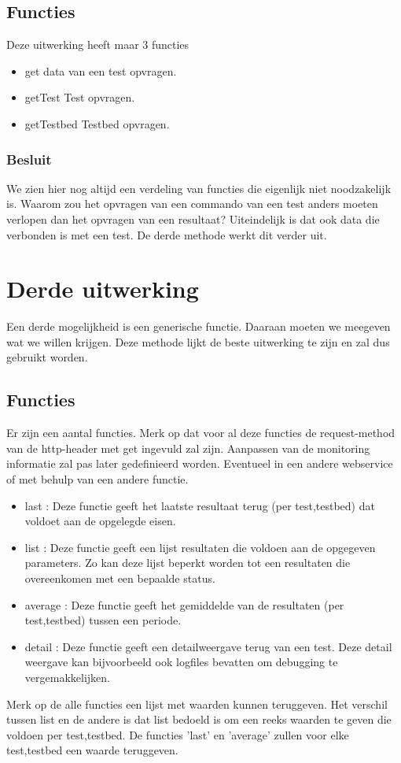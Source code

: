 \documentclass[11pt]{article}
\begin{document}
\subsection{Functies}
Deze uitwerking heeft maar 3 functies
\begin{itemize}
\item get        data van een test opvragen.
\item getTest	 Test opvragen.
\item getTestbed Testbed opvragen.
\end{itemize}
\subsubsection{Besluit}
We zien hier nog altijd een verdeling van functies die eigenlijk niet noodzakelijk is. Waarom zou het opvragen van een commando van een test anders moeten verlopen dan het opvragen van een resultaat? Uiteindelijk is dat ook data die verbonden is met een test. De derde methode werkt dit verder uit. 


\section{Derde uitwerking}
Een derde mogelijkheid is een generische functie. Daaraan moeten we meegeven wat we willen krijgen. Deze methode lijkt de beste uitwerking te zijn en zal dus gebruikt worden.

\subsection{Functies}
Er zijn een aantal functies. Merk op dat voor al deze functies de request-method van de http-header met get ingevuld zal zijn. Aanpassen van de monitoring informatie zal pas later gedefinieerd worden. Eventueel in een andere webservice of met behulp van een andere functie.
\begin{itemize}
\item last : Deze functie geeft het laatste resultaat terug (per test,testbed) dat voldoet aan de opgelegde eisen. 
\item list : Deze functie geeft een lijst resultaten die voldoen aan de opgegeven parameters. Zo kan deze lijst beperkt worden tot een resultaten die overeenkomen met een bepaalde status.
\item average : Deze functie geeft het gemiddelde van de resultaten (per test,testbed) tussen een periode.
\item detail : Deze functie geeft een detailweergave terug van een test. Deze detail weergave kan bijvoorbeeld ook logfiles bevatten om debugging te vergemakkelijken.
\end{itemize}
\clearpage
Merk op de alle functies een lijst met waarden kunnen teruggeven. Het verschil tussen list en de andere is dat list bedoeld is om een reeks waarden te geven die voldoen per test,testbed. De functies 'last' en 'average' zullen voor elke test,testbed een waarde teruggeven.\\
\end{document}
